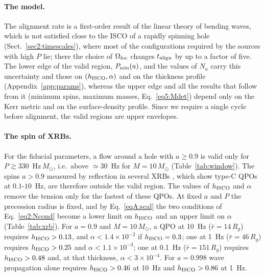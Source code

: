 \paragraph{The model.}
The alignment rate is a first-order result of the linear theory of bending waves, which is not satisfied close to the ISCO of a rapidly spinning hole (Sect.~\ref{sec2:timescales}), where most of the configurations required by the sources with high $P$ lie; there the choice of $\Omega_\textup{loc}$ changes $t_\textup{align}$ by up to a factor of five.
The lower edge of the valid region, $P_\textup{min}(a)$, and the values of $N_a$ carry this uncertainty and those on $(h_\textup{ISCO},\alpha)$ and on the thickness profile (Appendix~\ref{app:params}), whereas the upper edge and all the results that follow from it (minimum spins, maximum masses, Eq.~\ref{eq5:Mdet}) depend only on the Kerr metric and on the surface-density profile.
Since we require a single cycle before alignment, the valid regions are upper envelopes.

\paragraph{The spin of XRBs.}
For the fiducial parameters, a flow around a hole with $a\geq0.9$ is valid only for $P\gtrsim330$~Hz\,$M_\odot$, i.e.\ above $\simeq30$~Hz for $M=10\,M_\odot$ (Table~\ref{tab:window}).
The spins $a>0.9$ measured by reflection in several XRBs \citep{Reynolds2021}, which show type-C QPOs at $0.1$-$10$~Hz, are therefore outside the valid region.
The values of $h_\textup{ISCO}$ and $\alpha$ remove the tension only for the fastest of these QPOs.
At fixed $a$ and $P$ the precession radius is fixed, and by Eq.~\eqref{eqA:scal} the two conditions of Eq.~\eqref{eq2:Ncond} become a lower limit on $h_\textup{ISCO}$ and an upper limit on $\alpha$ (Table~\ref{tab:xrb}).
For $a=0.9$ and $M=10\,M_\odot$, a QPO at 10~Hz ($\bar r=14\,R_g$) requires $h_\textup{ISCO}>0.13$, and $\alpha<1.4\times10^{-2}$ if $h_\textup{ISCO}=0.3$; one at 1~Hz ($\bar r=46\,R_g$) requires $h_\textup{ISCO}>0.25$ and $\alpha<1.1\times10^{-3}$; one at 0.1~Hz ($\bar r=151\,R_g$) requires $h_\textup{ISCO}>0.48$ and, at that thickness, $\alpha<3\times10^{-4}$.
For $a=0.998$ wave propagation alone requires $h_\textup{ISCO}>0.46$ at 10~Hz and $h_\textup{ISCO}>0.86$ at 1~Hz.

